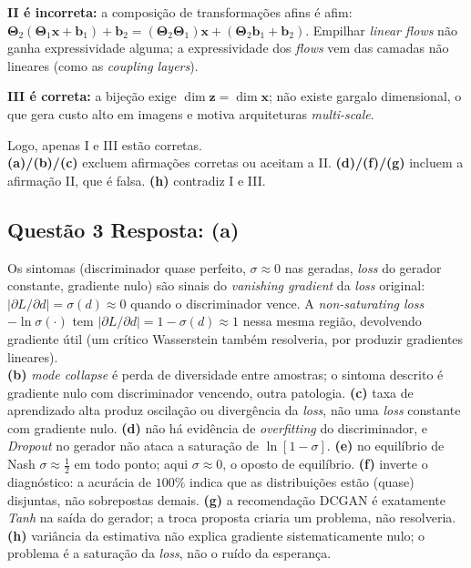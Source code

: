\documentclass[11pt,a4paper]{article}
\begin{document}
\textbf{II é incorreta:} a composição de transformações afins é afim: $\mathbf{\Theta}_2(\mathbf{\Theta}_1\mathbf{x} + \mathbf{b}_1) + \mathbf{b}_2 = (\mathbf{\Theta}_2\mathbf{\Theta}_1)\mathbf{x} + (\mathbf{\Theta}_2\mathbf{b}_1 + \mathbf{b}_2)$. Empilhar \textit{linear flows} não ganha expressividade alguma; a expressividade dos \textit{flows} vem das camadas não lineares (como as \textit{coupling layers}).

\textbf{III é correta:} a bijeção exige $\dim\mathbf{z} = \dim\mathbf{x}$; não existe gargalo dimensional, o que gera custo alto em imagens e motiva arquiteturas \textit{multi-scale}.

Logo, apenas I e III estão corretas.\\
\textbf{(a)/(b)/(c)} excluem afirmações corretas ou aceitam a II.
\textbf{(d)/(f)/(g)} incluem a afirmação II, que é falsa.
\textbf{(h)} contradiz I e III.

\subsection*{Questão 3 \textemdash{} Resposta: (a)}
Os sintomas (discriminador quase perfeito, $\sigma \approx 0$ nas geradas, \emph{loss} do gerador constante, gradiente nulo) são sinais do \textit{vanishing gradient} da \emph{loss} original: $|\partial L/\partial d| = \sigma(d) \approx 0$ quando o discriminador vence. A \textit{non-saturating loss} $-\ln\sigma(\cdot)$ tem $|\partial L/\partial d| = 1 - \sigma(d) \approx 1$ nessa mesma região, devolvendo gradiente útil (um crítico Wasserstein também resolveria, por produzir gradientes lineares).\\
\textbf{(b)} \textit{mode collapse} é perda de diversidade entre amostras; o sintoma descrito é gradiente nulo com discriminador vencendo, outra patologia.
\textbf{(c)} taxa de aprendizado alta produz oscilação ou divergência da \emph{loss}, não uma \emph{loss} constante com gradiente nulo.
\textbf{(d)} não há evidência de \textit{overfitting} do discriminador, e \textit{Dropout} no gerador não ataca a saturação de $\ln[1-\sigma]$.
\textbf{(e)} no equilíbrio de Nash $\sigma \approx \tfrac{1}{2}$ em todo ponto; aqui $\sigma \approx 0$, o oposto de equilíbrio.
\textbf{(f)} inverte o diagnóstico: a acurácia de $100\%$ indica que as distribuições estão (quase) disjuntas, não sobrepostas demais.
\textbf{(g)} a recomendação DCGAN é exatamente \emph{Tanh} na saída do gerador; a troca proposta criaria um problema, não resolveria.
\textbf{(h)} variância da estimativa não explica gradiente sistematicamente nulo; o problema é a saturação da \emph{loss}, não o ruído da esperança.
\end{document}

